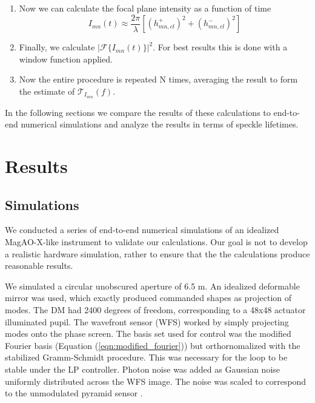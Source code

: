 \documentclass[11pt,preprint]{aastex}
\begin{document}
\begin{enumerate}
\item Now we can calculate the focal plane intensity as a function of time
\begin{equation}
I_{mn}(t) \approx \frac{2\pi}{\lambda}\left[ \left(h_{mn,cl}^+\right)^2 + \left(h_{mn,cl}^-\right)^2 \right] 
\end{equation}
\item Finally, we calculate $|\mathcal{F}\{I_{mn}(t)\}|^2$.  For best results this is done with a window function applied.
\item Now the entire procedure is repeated N times, averaging the result to form the estimate of $\mathcal{T}_{I_{mn}}(f)$.
\end{enumerate}

In the following sections we compare the results of these calculations to end-to-end numerical simulations and analyze the results in terms of speckle lifetimes.

\afterpage{\clearpage}



\section{Results}



\subsection{Simulations}

We conducted a series of end-to-end numerical simulations of an idealized MagAO-X-like instrument to validate our calculations.  Our goal is not to develop a realistic hardware simulation, rather to ensure that the the calculations produce reasonable results. 

We simulated a circular unobscured aperture of 6.5 m.   An idealized deformable mirror was used, which exactly produced commanded shapes as projection of modes.  The DM had 2400 degrees of freedom, corresponding to a 48x48 actuator illuminated pupil.  The wavefront sensor (WFS) worked by simply projecting modes onto the phase screen.  The basis set used for control was the modified Fourier basis (Equation (\ref{eqn:modified_fourier})) but orthornomalized with the stabilized Gramm-Schmidt procedure.  This was necessary for the loop to be stable under the LP controller.  Photon noise was added as Gaussian noise uniformly distributed across the WFS image.  The noise was scaled to correspond to the unmodulated pyramid sensor  \cite[$\beta_p = \sqrt{2}$,][]{2005ApJ...629..592G}.
\end{document}
